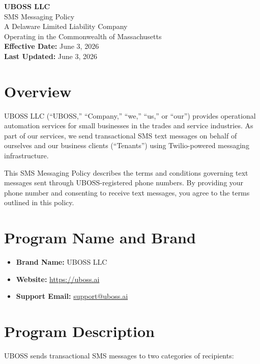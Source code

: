 \documentclass[11pt]{article}
\begin{document}
\begin{center}
    {\LARGE \textbf{UBOSS LLC}}\\[0.3em]
    {\Large SMS Messaging Policy}\\[1em]
    {\normalsize
        A Delaware Limited Liability Company\\
        Operating in the Commonwealth of Massachusetts\\[1em]
        \textbf{Effective Date:} June 3, 2026\\
        \textbf{Last Updated:} June 3, 2026
    }
\end{center}

\vspace{1.5em}

\section{Overview}

UBOSS LLC (``UBOSS,'' ``Company,'' ``we,'' ``us,'' or ``our'') provides operational automation services for small businesses in the trades and service industries. As part of our services, we send transactional SMS text messages on behalf of ourselves and our business clients (``Tenants'') using Twilio-powered messaging infrastructure.

This SMS Messaging Policy describes the terms and conditions governing text messages sent through UBOSS-registered phone numbers. By providing your phone number and consenting to receive text messages, you agree to the terms outlined in this policy.

\section{Program Name and Brand}

\begin{itemize}[leftmargin=2em]
    \item \textbf{Brand Name:} UBOSS LLC
    \item \textbf{Website:} \url{https://uboss.ai}
    \item \textbf{Support Email:} \href{mailto:support@uboss.ai}{support@uboss.ai}
\end{itemize}

\section{Program Description}

UBOSS sends transactional SMS messages to two categories of recipients:
\end{document}
